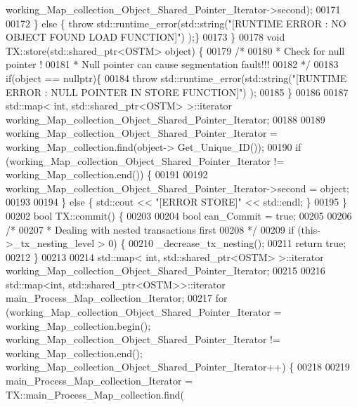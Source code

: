 \begin{DoxyCode}
      working\_Map\_collection\_Object\_Shared\_Pointer\_Iterator->second);
00171         
00172     \} \textcolor{keywordflow}{else} \{ \textcolor{keywordflow}{throw} std::runtime\_error(std::string(\textcolor{stringliteral}{"[RUNTIME ERROR : NO OBJECT FOUND LOAD FUNCTION]"}) );\}
00173 \}
00178 \textcolor{keywordtype}{void} TX::store(std::shared\_ptr<OSTM> \textcolor{keywordtype}{object}) \{
00179     \textcolor{comment}{/*}
00180 \textcolor{comment}{     * Check for null pointer !}
00181 \textcolor{comment}{     * Null pointer can cause segmentation fault!!!}
00182 \textcolor{comment}{     */}
00183     \textcolor{keywordflow}{if}(\textcolor{keywordtype}{object} == \textcolor{keyword}{nullptr})\{
00184         \textcolor{keywordflow}{throw} std::runtime\_error(std::string(\textcolor{stringliteral}{"[RUNTIME ERROR : NULL POINTER IN STORE FUNCTION]"}) );
00185     \}
00186     
00187     std::map< int, std::shared\_ptr<OSTM> >::iterator working\_Map\_collection\_Object\_Shared\_Pointer\_Iterator;
00188 
00189     working\_Map\_collection\_Object\_Shared\_Pointer\_Iterator = working\_Map\_collection.find(object->
      Get\_Unique\_ID());
00190     \textcolor{keywordflow}{if} (working\_Map\_collection\_Object\_Shared\_Pointer\_Iterator != working\_Map\_collection.end()) \{
00191 
00192         working\_Map\_collection\_Object\_Shared\_Pointer\_Iterator->second = object;
00193 
00194     \} \textcolor{keywordflow}{else} \{ std::cout << \textcolor{stringliteral}{"[ERROR STORE]"} << std::endl; \}
00195 \}
00202 \textcolor{keywordtype}{bool} TX::commit() \{
00203 
00204     \textcolor{keywordtype}{bool} can\_Commit = \textcolor{keyword}{true};
00205  
00206     \textcolor{comment}{/*}
00207 \textcolor{comment}{     * Dealing with nested transactions first }
00208 \textcolor{comment}{     */}
00209     \textcolor{keywordflow}{if} (this->\_tx\_nesting\_level > 0) \{
00210         \_decrease\_tx\_nesting();
00211         \textcolor{keywordflow}{return} \textcolor{keyword}{true};
00212     \} 
00213     
00214     std::map< int, std::shared\_ptr<OSTM> >::iterator working\_Map\_collection\_Object\_Shared\_Pointer\_Iterator;
00215 
00216     std::map<int, std::shared\_ptr<OSTM>>::iterator main\_Process\_Map\_collection\_Iterator;
00217     \textcolor{keywordflow}{for} (working\_Map\_collection\_Object\_Shared\_Pointer\_Iterator = working\_Map\_collection.begin(); 
      working\_Map\_collection\_Object\_Shared\_Pointer\_Iterator != working\_Map\_collection.end(); 
      working\_Map\_collection\_Object\_Shared\_Pointer\_Iterator++) \{
00218 
00219             main\_Process\_Map\_collection\_Iterator = TX::main\_Process\_Map\_collection.find(

\end{DoxyCode}
